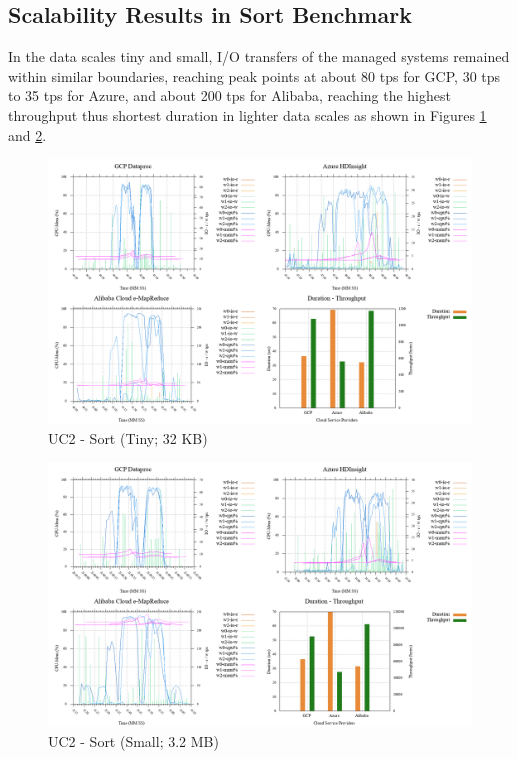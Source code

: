 \documentclass[review]{elsarticle}
\begin{document}
\subsection{Scalability Results in Sort Benchmark}
In the data scales tiny and small, I/O transfers of the managed systems remained within similar boundaries, reaching peak points at about 80 tps for GCP, 30 tps to 35 tps for Azure, and about 200 tps for Alibaba, reaching the highest throughput thus shortest duration in lighter data scales as shown in Figures \ref{fig:uc2-srt-t-cmidt} and \ref{fig:uc2-srt-s-cmidt}. 

\begin{figure}[p]
	\caption{UC2 - Sort (Tiny; 32 KB)}
	\label{fig:uc2-srt-t-cmidt}
	\includegraphics[width=\textwidth]{uc2-srt-t-cmidt}
	\centering
\end{figure}

\begin{figure}[p]
	\caption{UC2 - Sort (Small; 3.2 MB)}
	\label{fig:uc2-srt-s-cmidt}
	\includegraphics[width=\textwidth]{uc2-srt-s-cmidt}
	\centering
\end{figure}
\end{document}
